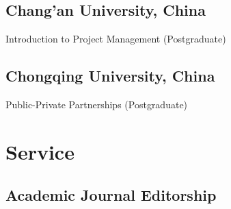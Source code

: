 \documentclass[11pt,a4paper]{report} %
\begin{document}
    \subsection*{Chang'an University, China}

    \begin{tablist}
        
        \item[2019] \tab{}Introduction to Project Management (Postgraduate)
        
    \end{tablist}

    \subsection*{Chongqing University, China}

    \begin{tablist}
        
        \item[2021--24] \tab{}Public-Private Partnerships (Postgraduate)
        
    \end{tablist}



    \section*{Service}

    \subsection*{Academic Journal Editorship}
\end{document}
